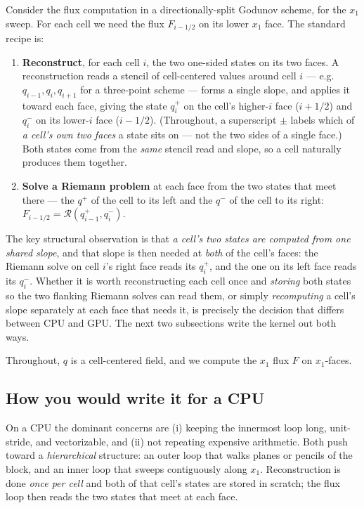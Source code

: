 \documentclass[11pt]{article}
\begin{document}
Consider the flux computation in a directionally-split Godunov scheme, for the
$x_1$ sweep. For each cell we need the flux $F_{i-1/2}$ on its lower $x_1$ face.
The standard recipe is:
\begin{enumerate}
\item \textbf{Reconstruct}, for each cell $i$, the two one-sided states on its two
  faces. A reconstruction reads a stencil of cell-centered values around cell $i$ ---
  e.g.\ $q_{i-1}, q_i, q_{i+1}$ for a three-point scheme --- forms a single slope, and
  applies it toward each face, giving the state $q^{+}_i$ on the cell's higher-$i$
  face ($i+1/2$) and $q^{-}_i$ on its lower-$i$ face ($i-1/2$). (Throughout, a
  superscript $\pm$ labels which of \emph{a cell's own two faces} a state sits on ---
  not the two sides of a single face.) Both states come from the \emph{same} stencil
  read and slope, so a cell naturally produces them together.
\item \textbf{Solve a Riemann problem} at each face from the two states that meet
  there --- the $q^{+}$ of the cell to its left and the $q^{-}$ of the cell to its
  right: $F_{i-1/2} = \mathcal{R}\!\left(q^{+}_{i-1}, q^{-}_i\right)$.
\end{enumerate}

The key structural observation is that \emph{a cell's two states are computed from
one shared slope}, and that slope is then needed at \emph{both} of the cell's faces:
the Riemann solve on cell $i$'s right face reads its $q^{+}_i$, and the one on its
left face reads its $q^{-}_i$. Whether it is worth reconstructing each cell once and
\emph{storing} both states so the two flanking Riemann solves can read them, or simply
\emph{recomputing} a cell's slope separately at each face that needs it, is precisely
the decision that differs between CPU and GPU. The next two subsections write the
kernel out both ways.

Throughout, $q$ is a cell-centered field, and we compute the $x_1$ flux
$F$ on $x_1$-faces.

\subsection{How you would write it for a CPU}
\label{sec:cpu}

On a CPU the dominant concerns are (i) keeping the innermost loop long,
unit-stride, and vectorizable, and (ii) not repeating expensive arithmetic. Both
push toward a \emph{hierarchical} structure: an outer loop that walks planes or
pencils of the block, and an inner loop that sweeps contiguously along $x_1$.
Reconstruction is done \emph{once per cell} and both of that cell's states are
stored in scratch; the flux loop then reads the two states that meet at each face.
\end{document}
